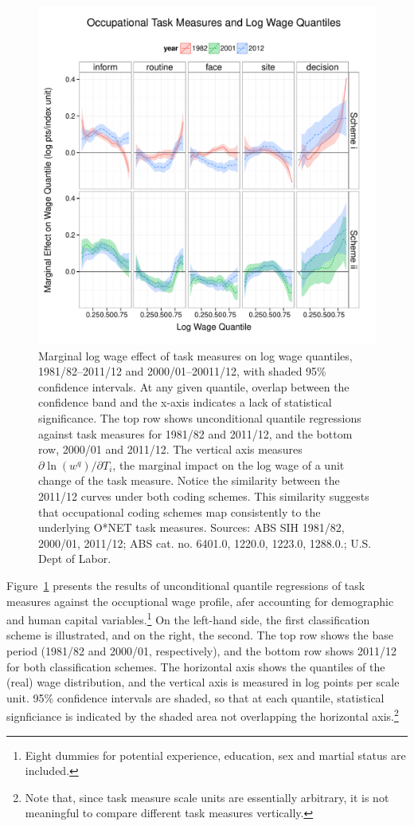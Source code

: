 \begin{figure}
  \centering
  \includegraphics[width=\textwidth]{../figure/rif2.pdf}
  \caption{Marginal log wage effect of task measures on log wage quantiles, 1981/82--2011/12 and 2000/01--20011/12, with shaded 95\% confidence intervals. At any given quantile, overlap between the confidence band and the x-axis indicates a lack of statistical significance. The top row shows unconditional quantile regressions against task measures for 1981/82 and 2011/12, and the bottom row, 2000/01 and 2011/12. The vertical axis measures $\partial\ln(w^q)/\partial T_i$, the marginal impact on the log wage of a unit change of the task measure. Notice the similarity between the 2011/12 curves under both coding schemes. This similarity suggests that occupational coding schemes map consistently to the underlying O*NET task measures. Sources: ABS SIH 1981/82, 2000/01, 2011/12; ABS cat. no. 6401.0, 1220.0, 1223.0, 1288.0.; U.S. Dept of Labor.}
  \label{fig:rif}
\end{figure}

Figure~\ref{fig:rif} presents the results of unconditional quantile regressions of task measures against the occuptional wage profile, afer accounting for demographic and human capital variables.\footnote{Eight dummies for potential experience, education, sex and martial status are included.} On the left-hand side, the first classification scheme is illustrated, and on the right, the second. The top row shows the base period (1981/82 and 2000/01, respectively), and the bottom row shows 2011/12 for both classification schemes. The horizontal axis shows the quantiles of the (real) wage distribution, and the vertical axis is measured in log points per scale unit. 95\% confidence intervals are shaded, so that at each quantile, statistical signficiance is indicated by the shaded area not overlapping the horizontal axis.\footnote{Note that, since task measure scale units are essentially arbitrary, it is not meaningful to compare different task measures vertically.}

